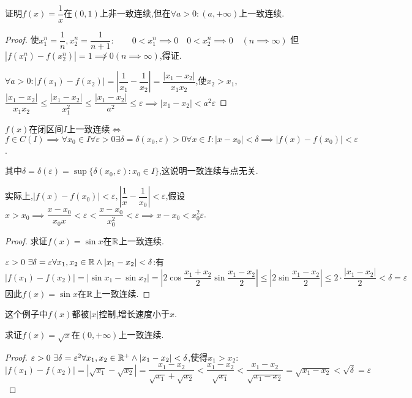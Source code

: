 \documentclass[UTF8]{book}
\begin{document}
    \begin{example}
        证明$f(x)=\dfrac{1}{x}$在$(0,1)$上非一致连续,但在$\forall a>0:(a,+\infty)$上一致连续.
    \end{example}
    \begin{proof}
        使$x_1^n=\dfrac{1}{n},x_2^n=\dfrac{1}{n+1}:\qquad 0<x_1^n\implies 0\quad 0<x^n_2\implies 0\quad (n\implies \infty)$
        但$|f(x_1^n)-f(x_2^n)|=1\not\implies 0(n\implies \infty)$,得证.

        $\forall a>0:|f(x_1)-f(x_2)|=|\dfrac{1}{x_1}-\dfrac{1}{x_2}|=\dfrac{|x_1-x_2|}{x_1x_2}$,使$x_2>x_1$,$\dfrac{|x_1-x_2|}{x_1x_2}\leq \dfrac{|x_1-x_2|}{x_1^2}\leq \dfrac{|x_1-x_2|}{a^2}\leq \varepsilon\implies |x_1-x_2|< a^2\varepsilon$
    \end{proof}
    \begin{remark}
        $f(x)$在闭区间$I$上一致连续$\iff$ \\ $f\in C(I)\implies \forall x_0\in I\forall \varepsilon>0\exists \delta=\delta(x_0,\varepsilon)>0\forall x\in I:|x-x_0|<\delta\implies |f(x)-f(x_0)|<\varepsilon$.
        
        其中$\delta=\delta(\varepsilon)=\sup\{\delta(x_0,\varepsilon):x_0\in I\}$,这说明一致连续与点无关.
    \end{remark}
    实际上,$|f(x)-f(x_0)|<\varepsilon,|\dfrac{1}{x}-\dfrac{1}{x_0}|<\varepsilon$,假设$x>x_0\implies \dfrac{x-x_0}{x_0x}<\varepsilon<\dfrac{x-x_0}{x_0^2}<\varepsilon\implies x-x_0<x_0^2\varepsilon$.
    \begin{proof}
        求证$f(x)=\sin x$在$\mathbb{R}$上一致连续.

        $\varepsilon>0~\exists\delta=\varepsilon\forall x_1,x_2\in\mathbb{R}\land |x_1-x_2|<\delta$:有\[|f(x_1)-f(x_2)|=|\sin x_1 -\sin x_2 |=|2\cos\frac{x_1+x_2}{2}\sin\frac{x_1-x_2}{2}|\leq |2\sin \frac{x_1-x_2}{2}|\leq 2\cdot\frac{|x_1-x_2|}{2}<\delta=\varepsilon\]
        因此$f(x)=\sin x$在$\mathbb{R}$上一致连续.
    \end{proof}
    这个例子中$f(x)$都被$|x|$控制,增长速度小于$x$.
    \begin{example}
        求证$f(x)=\sqrt{x}$在$(0,+\infty)$上一致连续.
    \end{example}
    \begin{proof}
        $\varepsilon>0~\exists\delta=\varepsilon^2\forall x_1,x_2\in\mathbb{R}^+\land |x_1-x_2|<\delta$,使得$x_1>x_2$:\[|f(x_1)-f(x_2)|=|\sqrt{x_1}-\sqrt{x_2}|=\frac{x_1-x_2}{\sqrt{x_1}+\sqrt{x_2}}<\frac{x_1-x_2}{\sqrt{x_1}}<\frac{x_1-x_2}{\sqrt{x_1-x_2}}=\sqrt{x_1-x_2}<\sqrt{\delta}=\varepsilon\]
    \end{proof}
\end{document}
